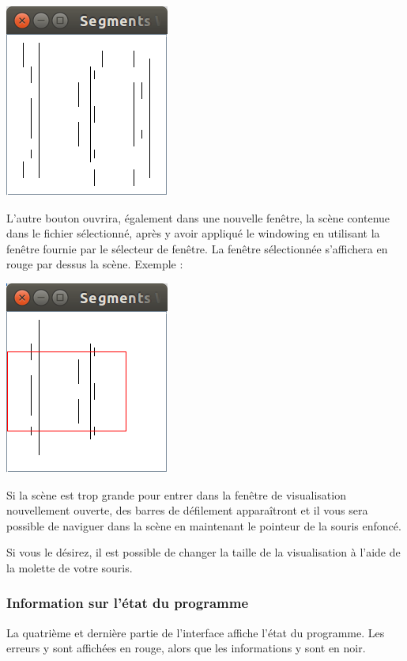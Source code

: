 \documentclass[10pt,a4paper]{article}
\begin{document}
\centerline{\includegraphics[scale=0.5]{images/ui_whole_scene.png}}

L'autre bouton ouvrira, également dans une nouvelle fenêtre, la scène contenue dans le fichier sélectionné, après y avoir appliqué le windowing en utilisant la fenêtre fournie par le sélecteur de fenêtre. La fenêtre sélectionnée s'affichera en rouge par dessus la scène. Exemple :

\centerline{\includegraphics[scale=0.5]{images/ui_restricted_window.png}}

Si la scène est trop grande pour entrer dans la fenêtre de visualisation nouvellement ouverte, des barres de défilement apparaîtront et il vous sera possible de naviguer dans la scène en maintenant le pointeur de la souris enfoncé.

Si vous le désirez, il est possible de changer la taille de la visualisation à l'aide de la molette de votre souris.

\subsubsection{Information sur l'état du programme}
La quatrième et dernière partie de l'interface affiche l'état du programme. Les erreurs y sont affichées en rouge, alors que les informations y sont en noir.
\end{document}
